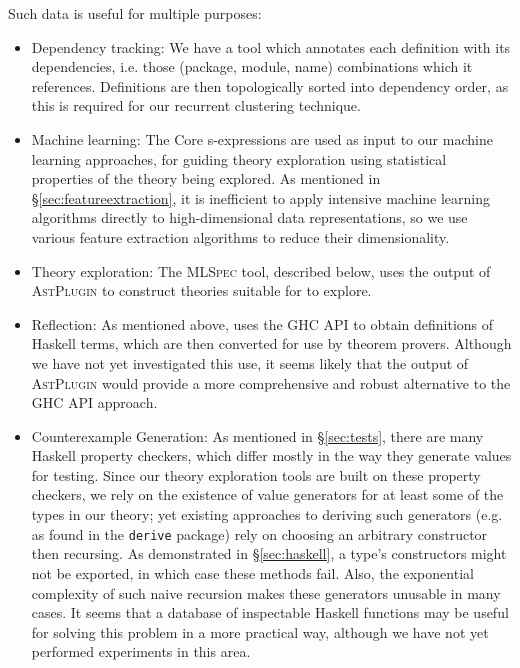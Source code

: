 Such data is useful for multiple purposes:

\begin{itemize}
  \item{Dependency tracking}: We have a tool which annotates each definition with its dependencies, i.e. those (package, module, name) combinations which it references. Definitions are then topologically sorted into dependency order, as this is required for our recurrent clustering technique.

  \item{Machine learning}: The Core s-expressions are used as input to our machine learning approaches, for guiding theory exploration using statistical properties of the theory being explored. As mentioned in \S \ref{sec:featureextraction}, it is inefficient to apply intensive machine learning algorithms directly to high-dimensional data representations, so we use various feature extraction algorithms to reduce their dimensionality.

  \item{Theory exploration}: The \textsc{MLSpec} tool, described below, uses the output of \textsc{AstPlugin} to construct theories suitable for \qspec{} to explore.

  \item{Reflection}: As mentioned above, \hspec{} uses the GHC API to obtain definitions of Haskell terms, which are then converted for use by theorem provers. Although we have not yet investigated this use, it seems likely that the output of \textsc{AstPlugin} would provide a more comprehensive and robust alternative to the GHC API approach.

  \item{Counterexample Generation}: As mentioned in \S \ref{sec:tests}, there are many Haskell property checkers, which differ mostly in the way they generate values for testing. Since our theory exploration tools are built on these property checkers, we rely on the existence of value generators for at least some of the types in our theory; yet existing approaches to deriving such generators (e.g. as found in the \texttt{derive} package) rely on choosing an arbitrary constructor then recursing. As demonstrated in \S \ref{sec:haskell}, a type's constructors might not be exported, in which case these methods fail. Also, the exponential complexity of such naive recursion makes these generators unusable in many cases. It seems that a database of inspectable Haskell functions may be useful for solving this problem in a more practical way, although we have not yet performed experiments in this area.
\end{itemize}

